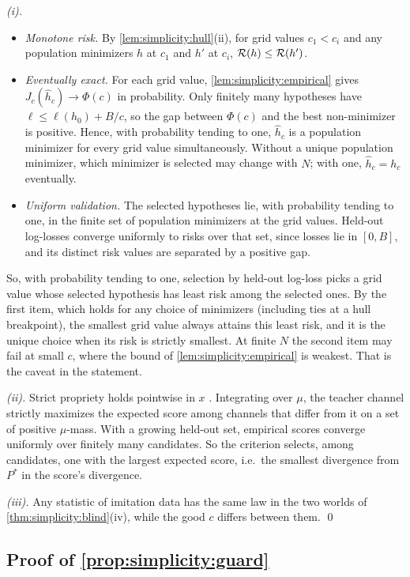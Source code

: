 \emph{(i).}
\begin{itemize}
\item \emph{Monotone risk.} By \cref{lem:simplicity:hull}(ii), for grid values $c_1<c_i$ and any population minimizers $h$ at $c_1$ and $h'$ at $c_i$, $\mathcal R(h)\le\mathcal R(h')$.
\item \emph{Eventually exact.} For each grid value, \cref{lem:simplicity:empirical} gives $J_c(\hat h_c)\to\Phi(c)$ in probability. Only finitely many hypotheses have $\ell\le\ell(h_0)+B/c$, so the gap between $\Phi(c)$ and the best non-minimizer is positive. Hence, with probability tending to one, $\hat h_c$ is a population minimizer for every grid value simultaneously. Without a unique population minimizer, which minimizer is selected may change with $N$; with one, $\hat h_c=h_c$ eventually.
\item \emph{Uniform validation.} The selected hypotheses lie, with probability tending to one, in the finite set of population minimizers at the grid values. Held-out log-losses converge uniformly to risks over that set, since losses lie in $[0,B]$, and its distinct risk values are separated by a positive gap.
\end{itemize}
So, with probability tending to one, selection by held-out log-loss picks a grid value whose selected hypothesis has least risk among the selected ones. By the first item, which holds for any choice of minimizers (including ties at a hull breakpoint), the smallest grid value always attains this least risk, and it is the unique choice when its risk is strictly smallest. At finite $N$ the second item may fail at small $c$, where the bound of \cref{lem:simplicity:empirical} is weakest. That is the caveat in the statement.

\emph{(ii).} Strict propriety holds pointwise in $x$ \citep{gneiting2007strictly}. Integrating over $\mu$, the teacher channel strictly maximizes the expected score among channels that differ from it on a set of positive $\mu$-mass. With a growing held-out set, empirical scores converge uniformly over finitely many candidates. So the criterion selects, among candidates, one with the largest expected score, i.e.\ the smallest divergence from $P^*$ in the score's divergence.

\emph{(iii).} Any statistic of imitation data has the same law in the two worlds of \cref{thm:simplicity:blind}(iv), while the good $c$ differs between them.
\qed

\subsection{Proof of \texorpdfstring{\cref{prop:simplicity:guard}}{guard erosion}}\label{app:simplicity:guard}

